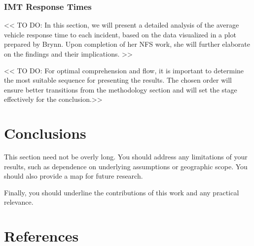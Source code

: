 \documentclass[
  letterpaper,
  authoryear]{elsarticle}
\begin{document}
\hypertarget{imt-response-times}{%
\subsubsection{IMT Response Times}\label{imt-response-times}}

\textless\textless{} TO DO: In this section, we will present a detailed
analysis of the average vehicle response time to each incident, based on
the data visualized in a plot prepared by Brynn. Upon completion of her
NFS work, she will further elaborate on the findings and their
implications. \textgreater\textgreater{}

\textless\textless{} TO DO: For optimal comprehension and flow, it is
important to determine the most suitable sequence for presenting the
results. The chosen order will ensure better transitions from the
methodology section and will set the stage effectively for the
conclusion.\textgreater\textgreater{}


\hypertarget{conclusions}{%
\section{Conclusions}\label{conclusions}}

This section need not be overly long. You should address any limitations
of your results, such as dependence on underlying assumptions or
geographic scope. You should also provide a map for future research.

Finally, you should underline the contributions of this work and any
practical relevance.


\hypertarget{references}{%
\section*{References}\label{references}}


\renewcommand{\bibsection}{}

\end{document}
